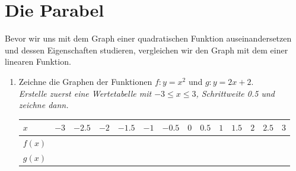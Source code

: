 \documentclass[11pt,oneside]{article}
\begin{document}
\section{Die Parabel}
	Bevor wir uns mit dem Graph einer quadratischen Funktion auseinandersetzen und dessen Eigenschaften studieren, vergleichen wir den Graph mit dem einer linearen Funktion.
	\begin{aufgabe}
		\begin{enumerate}[label=\alph*)]
			\item Zeichne die Graphen der Funktionen $f:y=x^2$ und $g:y=2x+2$.\\ \emph{Erstelle zuerst eine Wertetabelle mit $-3\leq x\leq 3$, Schrittweite 0.5 und zeichne dann.}
			\begingroup
			\renewcommand{\arraystretch}{1.5}
			\begin{table}[H]
				\centering
				\begin{tabular}{|p{0.6cm}|p{0.6cm}|p{0.6cm}|p{0.6cm}|p{0.6cm}|p{0.6cm}|p{0.6cm}|p{0.6cm}|p{0.6cm}|p{0.6cm}|p{0.6cm}|p{0.6cm}|p{0.6cm}|p{0.6cm}|} \hline
					$x$  & $-3$ & $-2.5$ & $-2$ & $-1.5$ & $-1$ & $-0.5$ & $0$ & $0.5$ & $1$ & $1.5$ & $2$ & $2.5$ & $3$ \\\hline
					$f(x)$  & & & & & & & & & & & & & \\\hline
					$g(x)$  & & & & & & & & & & & & & \\\hline
				\end{tabular}
			\end{table}
			\endgroup


\end{enumerate}
\end{aufgabe}
\end{document}
